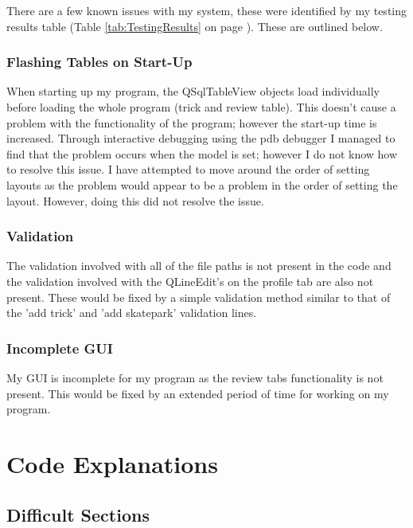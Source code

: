 There are a few known issues with my system, these were identified by my testing results table (Table \ref{tab:TestingResults} on page \pageref{tab:TestingResults}). These are outlined below.

\subsubsection{Flashing Tables on Start-Up}

When starting up my program, the QSqlTableView objects load individually before loading the whole program (trick and review table). This doesn't cause a problem with the functionality of the program; however the start-up time is increased. Through interactive debugging using the pdb debugger I managed to find that the problem occurs when the model is set; however I do not know how to resolve this issue. I have attempted to move around the order of setting layouts as the problem would appear to be a problem in the order of setting the layout. However, doing this did not resolve the issue.

\subsubsection{Validation}

The validation involved with all of the file paths is not present in the code and the validation involved with the QLineEdit's on the profile tab are also not present. These would be fixed by a simple validation method similar to that of the 'add trick' and 'add skatepark' validation lines.

\subsubsection{Incomplete GUI}

My GUI is incomplete for my program as the review tabs functionality is not present. This would be fixed by an extended period of time for working on my program.









\section{Code Explanations}

\subsection{Difficult Sections}

